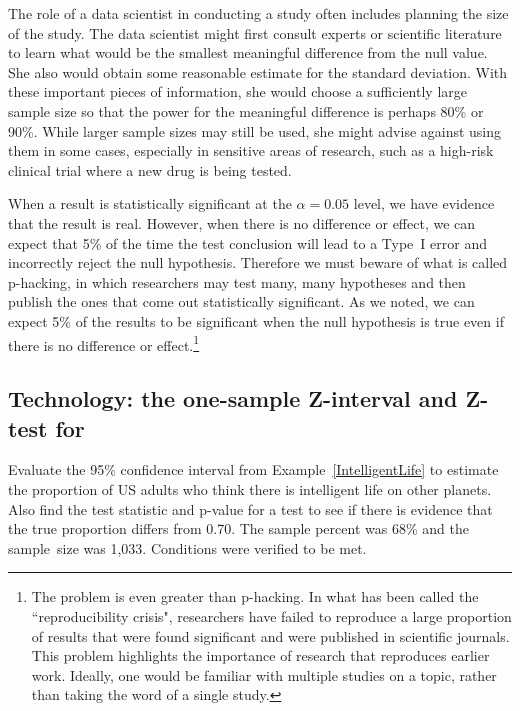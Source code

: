 The role of a data scientist in conducting a study often includes planning the size of the study. The data scientist might first consult experts or scientific literature to learn what would be the smallest meaningful difference from the null value. She also would obtain some reasonable estimate for the standard deviation. With these important pieces of information, she would choose a sufficiently large sample size so that the power for the meaningful difference is perhaps 80\% or 90\%. While larger sample sizes may still be used, she might advise against using them in some cases, especially in sensitive areas of research, such as a high-risk clinical trial where a new drug is being tested.

When a result is statistically significant at the $\alpha=0.05$ level, we have evidence that the result is real.
However, when there is no difference or effect, we can expect that 5\% of the time the test conclusion will lead to a Type~I error and incorrectly reject the null hypothesis.
Therefore we must beware of what is called p-hacking, in which researchers may test many, many hypotheses and then publish the ones that come out statistically significant.
As we noted, we can expect 5\% of the results to be significant when the null hypothesis is true even if there is no difference or effect.\footnote{
The problem is even greater than p-hacking.  In what has been called the ``reproducibility crisis", researchers have failed to reproduce a large proportion of results that were found significant and were published in scientific journals.
This problem highlights the importance of research that
reproduces earlier work. Ideally, one would be familiar with multiple studies on a topic, rather than taking the word of
a single study.

}

\newpage

\subsection[Technology: the one-sample Z-interval and Z-test for $p$]{Technology: the one-sample Z-interval and Z-test for }
\label{tech1Z}

\noindent Evaluate the 95\% confidence interval from Example~\ref{IntelligentLife} to estimate the proportion of US adults who think there is intelligent life on other planets.  Also find the test statistic and p-value for a test to see if there is evidence that the true proportion differs from 0.70.  The sample percent was 68\% and the sample~size was 1,033.  Conditions were verified to be met.
\\

